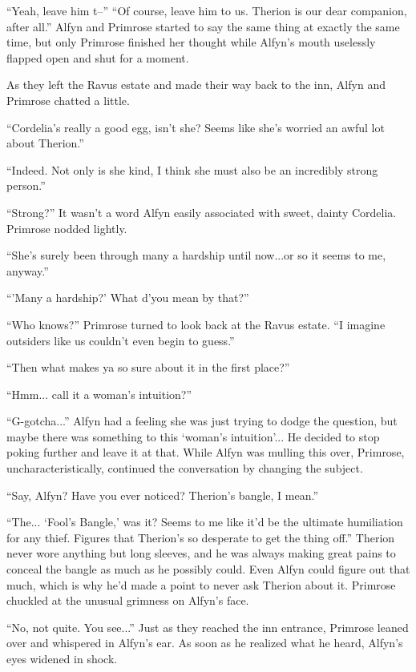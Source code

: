 ``Yeah, leave him t--'' ``Of course, leave him to us. Therion is our dear companion, after all.'' Alfyn and Primrose started to say the same thing at exactly the same time, but only Primrose finished her thought while Alfyn's mouth uselessly flapped open and shut for a moment. 

As they left the Ravus estate and made their way back to the inn, Alfyn and Primrose chatted a little.

``Cordelia's really a good egg, isn't she? Seems like she's worried an awful lot about Therion.''

``Indeed. Not only is she kind, I think she must also be an incredibly strong person.''

``Strong?'' It wasn't a word Alfyn easily associated with sweet, dainty Cordelia. Primrose nodded lightly.

``She's surely been through many a hardship until now...or so it seems to me, anyway.''

``'Many a hardship?' What d'you mean by that?''

``Who knows?'' Primrose turned to look back at the Ravus estate. ``I imagine outsiders like us couldn't even begin to guess.''

``Then what makes ya so sure about it in the first place?''

``Hmm... call it a woman's intuition?''

``G-gotcha...'' Alfyn had a feeling she was just trying to dodge the question, but maybe there was something to this `woman's intuition'... He decided to stop poking further and leave it at that. While Alfyn was mulling this over, Primrose, uncharacteristically, continued the conversation by changing the subject.

``Say, Alfyn? Have you ever noticed? Therion's bangle, I mean.''

``The... `Fool's Bangle,' was it? Seems to me like it'd be the ultimate humiliation for any thief. Figures that Therion's so desperate to get the thing off.'' Therion never wore anything but long sleeves, and he was always making great pains to conceal the bangle as much as he possibly could. Even Alfyn could figure out that much, which is why he'd made a point to never ask Therion about it. Primrose chuckled at the unusual grimness on Alfyn's face.

``No, not quite. You see...'' Just as they reached the inn entrance, Primrose leaned over and whispered in Alfyn's ear. As soon as he realized what he heard, Alfyn's eyes widened in shock.

